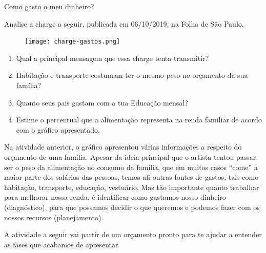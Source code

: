 \begin{task}{Como gasto o meu dinheiro?}

Analise a charge a seguir, publicada em 06/10/2019, na Folha de São Paulo.

\begin{figure}[H]
\centering
\texttt{[image: charge-gastos.png]}

\end{figure}

\begin{enumerate}
\item Qual a principal mensagem que essa charge tenta transmitir?
\item Habitação e transporte costumam ter o mesmo peso no orçamento da sua família?
\item Quanto seus pais gastam com a tua Educação mensal?
\item Estime o percentual que a alimentação representa na renda familiar de acordo com o gráfico apresentado.

\end{enumerate}
\end{task}

Na atividade anterior, o gráfico apresentou várias informações a respeito do orçamento de uma família. Apesar da ideia principal que o artista tentou passar ser o peso da alimentação no consumo da família, que em muitos casos “come” a maior parte dos salários das pessoas, temos ali outras fontes de gastos, tais como habitação, transporte, educação, vestuário. Mas tão importante quanto trabalhar para melhorar nossa renda, é identificar como gastamos nosso dinheiro (diagnóstico), para que possamos decidir o que queremos e podemos fazer com os nossos recursos (planejamento). 

A atividade a seguir vai partir de um orçamento pronto para te ajudar a entender as fases que acabamos de apresentar

